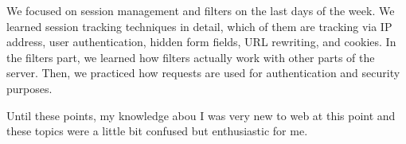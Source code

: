 We focused on session management and filters on the last days of the week. We learned session tracking techniques in detail, which of them are tracking via IP address, user authentication, hidden form fields, URL rewriting, and cookies. In the filters part, we learned how filters actually work with other parts of the server. Then, we practiced how requests are used for authentication and security purposes.


Until these points, my knowledge abou
I was very new to web at this point and these topics were a little bit confused but enthusiastic for me.
